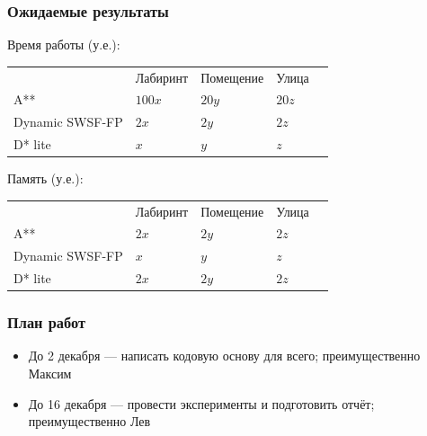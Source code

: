 \documentclass{beamer}
\begin{document}
    \begin{frame}
        \frametitle{Ожидаемые результаты}
        Время работы (у.е.):
        \begin{table}[]
            \begin{tabular}{lllll}
                & Лабиринт & Помещение & Улица & \\
                A**             & $100x$   & $20y$     & $20z$ & \\
                Dynamic SWSF-FP & $2x$     & $2y$      & $2z$  & \\
                D* lite         & $x$      & $y$       & $z$   &
            \end{tabular}
        \end{table}

        Память (у.е.):
        \begin{table}[]
            \begin{tabular}{lllll}
                & Лабиринт & Помещение & Улица & \\
                A**             & $2x$     & $2y$      & $2z$  & \\
                Dynamic SWSF-FP & $x$      & $y$       & $z$   & \\
                D* lite         & $2x$     & $2y$      & $2z$  &
            \end{tabular}
        \end{table}


    \end{frame}

    \begin{frame}
        \frametitle{План работ}
        \begin{itemize}
            \item До 2 декабря --- написать кодовую основу для всего; преимущественно Максим
            \item До 16 декабря --- провести эксперименты и подготовить отчёт; преимущественно Лев
        \end{itemize}
    \end{frame}
\end{document}
